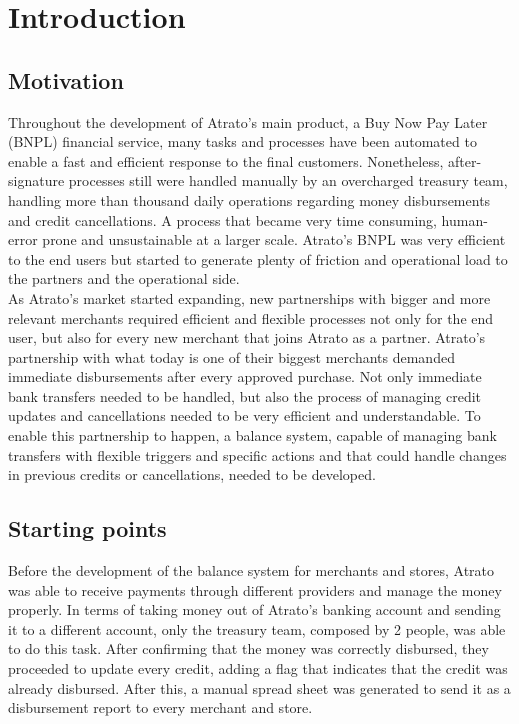 \chapter{Introduction}


\section{Motivation}

Throughout the development of Atrato’s main product, a Buy Now Pay Later (BNPL) financial service, many tasks and processes have been automated to enable a fast and efficient response to the final customers. Nonetheless, after-signature processes still were handled manually by an overcharged treasury team, handling more than thousand daily operations regarding money disbursements and credit cancellations. A process that became very time consuming, human-error prone and unsustainable at a larger scale. Atrato’s BNPL was very efficient to the end users but started to generate plenty of friction and operational load to the partners and the operational side.\\

As Atrato’s market started expanding, new partnerships with bigger and more relevant merchants required efficient and flexible processes not only for the end user, but also for every new merchant that joins Atrato as a partner. Atrato’s partnership with what today is one of their biggest merchants demanded immediate disbursements after every approved purchase. Not only immediate bank transfers needed to be handled, but also the process of managing credit updates and cancellations needed to be very efficient and understandable. To enable this partnership to happen, a balance system, capable of managing bank transfers with flexible triggers and specific actions and that could handle changes in previous credits or cancellations, needed to be developed.


\section{Starting points}

Before the development of the balance system for merchants and stores, Atrato was able to receive payments through different providers and manage the money properly.  In terms of taking money out of Atrato’s banking account and sending it to a different account, only the treasury team, composed by 2 people, was able to do this task. After confirming that the money was correctly disbursed, they proceeded to update every credit, adding a flag that indicates that the credit was already disbursed. After this, a manual spread sheet was generated to send it as a disbursement report to every merchant and store.\\

